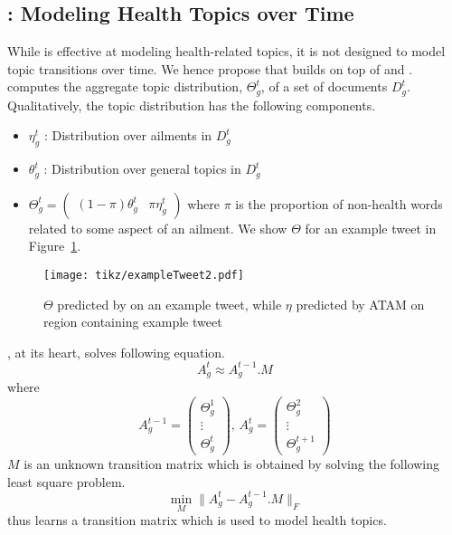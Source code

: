 \subsection{\tmatam: Modeling Health Topics over Time}
\label{subsec:model}
While \atam is effective at modeling health-related topics, 
it is not designed to model topic transitions over time. 
We hence propose \tmatam that builds on top of \atam and \tmlda. 
\tmatam computes the aggregate topic distribution, $\Theta_g^t$, 
of a set of documents $D_g^t$. Qualitatively, the topic distribution 
has the following components. 
\begin{itemize}
\item $\eta_g^t$ : Distribution over ailments in $D_g^t$
\item $\theta_g^t$ : Distribution over general topics in $D_g^t$
\item $\Theta_g^t=\begin{pmatrix}(1-\pi)\theta_g^t& \pi\eta_g^t\end{pmatrix}$ 
where $\pi$ is the proportion of non-health words related to some 
aspect of an ailment. We show $\Theta$ for an example tweet in 
Figure~\ref{fig:exampleTweet2}.
\end{itemize}
\begin{figure}[b!]
\centering
\texttt{[image: tikz/exampleTweet2.pdf]}
\caption{$\Theta$ predicted by \atam on an example tweet, while $\eta$ predicted by ATAM on region containing example tweet}
\label{fig:exampleTweet2}
\end{figure}

\tmatam, at its heart, solves following equation.
\begin{equation}
A_g^{t}\approx A_g^{t-1}.M
\end{equation}
where
\begin{equation}
A_g^{t-1}=\begin{pmatrix}\Theta_g^1\\\vdots\\\Theta_g^t\end{pmatrix},\,A_g^t=\begin{pmatrix}\Theta_g^2\\\vdots\\\Theta_g^{t+1}\end{pmatrix}%
\end{equation}
$M$ is an unknown transition matrix which is obtained by solving the following least square problem.
\[
\min_M\|A_g^t- A_g^{t-1}.M\|_F
\]
\tmatam thus learns a transition matrix which is used to model health topics.

